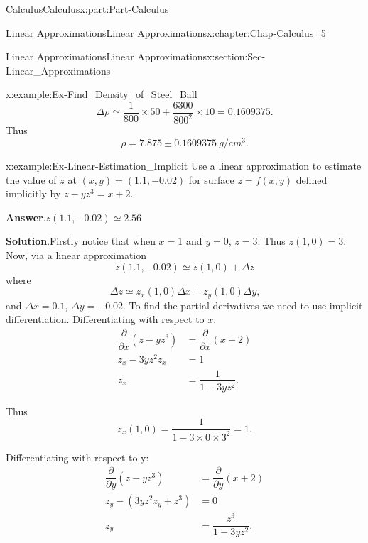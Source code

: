 \documentclass[oneside,10pt,]{book}
\newcommand{\blocktitlefont}{\relax}
\numberwithin{equation}{section}
\newcommand{\amp}{&}
\begin{document}
\begin{partptx}{Calculus}{}{Calculus}{}{}{x:part:Part-Calculus}
\begin{chapterptx}{Linear Approximations}{}{Linear Approximations}{}{}{x:chapter:Chap-Calculus_5}
\begin{sectionptx}{Linear Approximations}{}{Linear Approximations}{}{}{x:section:Sec-Linear_Approximations}
\begin{example}{}{x:example:Ex-Find_Density_of_Steel_Ball}
\begin{equation*}
\Delta \rho \simeq \frac{1}{800} \times 50 + \frac{6300}{800^2} \times 10 = 0.1609375\text{.}
\end{equation*}
Thus%
\begin{equation*}
\rho = 7.875 \pm 0.1609375 \: g/cm^3\text{.}
\end{equation*}
%
\end{example}
\begin{example}{}{x:example:Ex-Linear-Estimation_Implicit}%
Use a linear approximation to estimate the value of \(z\) at \((x,y) = (1.1,-0.02)\) for surface \(z = f(x,y)\) defined implicitly by \(z-yz^3 = x+2\).%
\par\smallskip%
\noindent\textbf{\blocktitlefont Answer}.\hypertarget{g:answer:id549115}{}\quad{}\(z(1.1,-0.02) \simeq 2.56\)%
\par\smallskip%
\noindent\textbf{\blocktitlefont Solution}.\hypertarget{g:solution:id549086}{}\quad{}Firstly  notice  that  when \(x=1\) and \(y=0\), \(z=3\). Thus \(z(1,0)=3\). Now, via a linear approximation%
\begin{equation*}
z(1.1,-0.02) \simeq z(1,0) + \Delta z
\end{equation*}
where%
\begin{equation*}
\Delta z \simeq z_x(1,0) \Delta x + z_y(1,0) \Delta y\text{,}
\end{equation*}
and \(\Delta x = 0.1\), \(\Delta y = -0.02\). To find the partial derivatives we need to use implicit differentiation. Differentiating with respect to \(x\):%
\begin{align*}
\dfrac{\partial}{\partial x} (z - yz^3) \amp = \dfrac{\partial}{\partial x} (x+2)\\
z_x - 3y z^2 z_x \amp = 1\\
z_x \amp = \dfrac{1}{1-3yz^2}\text{.}
\end{align*}
%
\par
Thus%
\begin{equation*}
z_x(1,0) = \dfrac{1}{1-3 \times 0 \times 3^2} = 1\text{.}
\end{equation*}
%
\par
Differentiating with respect to y:%
\begin{align*}
\dfrac{\partial}{\partial y} (z - yz^3) \amp = \dfrac{\partial}{\partial y} (x+2)\\
z_y - (3y z^2 z_y + z^3) \amp = 0\\
z_y \amp = \dfrac{z^3}{1-3yz^2}\text{.}
\end{align*}
%
\par

\end{example}
\end{sectionptx}
\end{chapterptx}
\end{partptx}
\end{document}
